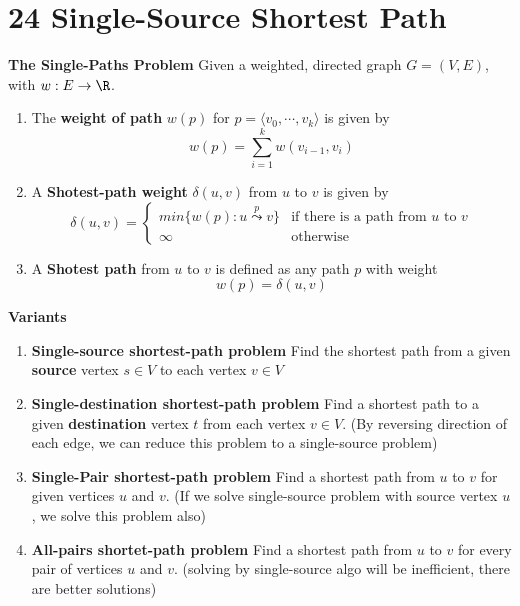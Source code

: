 \documentclass[11pt]{article}
\begin{document}
\section*{24 Single-Source Shortest Path}


\begin{defn*}
    \textbf{The Single-Paths Problem} Given a weighted, directed graph $G = (V,E)$, with $w: E\to\R$.

    \begin{enumerate}
        \item The \textbf{weight of path} $w(p)$ for $p = \langle v_0, \cdots, v_k \rangle$ is given by
        \[
            w(p) = \sum_{i=1}^k w(v_{i-1}, v_i)   
        \] 
        \item A \textbf{Shotest-path weight} $\delta(u,v)$ from $u$ to $v$ is given by 
        \[
            \delta(u,v) = 
            \begin{cases}
                min\{w(p): u\overset{p}{\leadsto} v \} & \text{if there is a path from $u$ to $v$}\\
                \infty & \text{otherwise}
            \end{cases}
        \]
        \item A \textbf{Shotest path} from $u$ to $v$ is defined as any path $p$ with weight 
        \[
            w(p) = \delta(u,v)
        \]
    \end{enumerate}

\end{defn*}


\begin{defn*}
    \textbf{Variants}
    \begin{enumerate}
        \item \textbf{Single-source shortest-path problem} Find the shortest path from a given \textbf{source} vertex $s\in V$ to each vertex $v\in V$
        \item \textbf{Single-destination shortest-path problem} Find a shortest path to a given \textbf{destination} vertex $t$ from each vertex $v\in V$. (By reversing direction of each edge, we can reduce this problem to a single-source problem)
        \item \textbf{Single-Pair shortest-path problem} Find a shortest path from $u$ to $v$ for given vertices $u$ and $v$. (If we solve single-source problem with source vertex $u$, we solve this problem also)
        \item \textbf{All-pairs shortet-path problem} Find a shortest path from $u$ to $v$ for every pair of vertices $u$ and $v$. (solving by single-source algo will be inefficient, there are better solutions)
    \end{enumerate}
\end{defn*}
\end{document}
